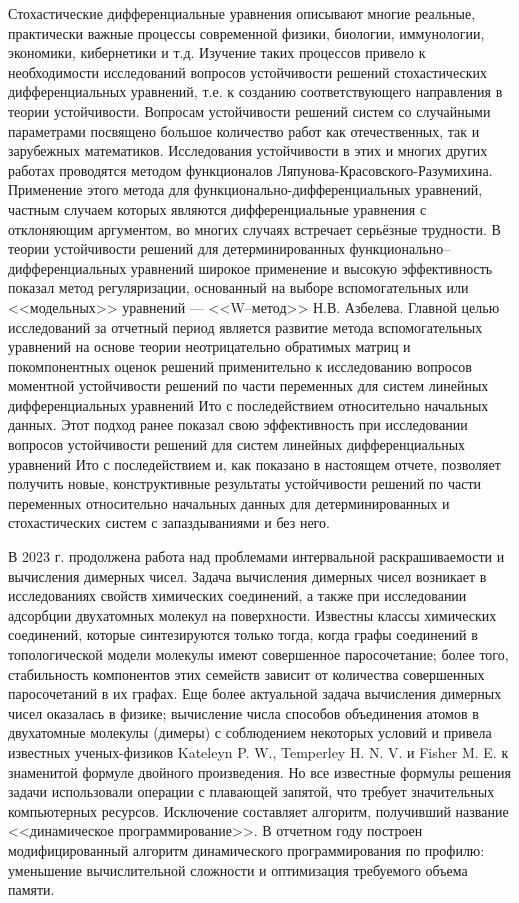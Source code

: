 Стохастические дифференциальные уравнения описывают многие реальные, практически важные процессы современной физики, биологии, иммунологии, экономики, кибернетики и т.д. Изучение таких процессов привело к необходимости исследований вопросов устойчивости решений стохастических дифференциальных
уравнений, т.е. к созданию соответствующего направления в теории устойчивости. 
Вопросам устойчивости решений систем со случайными параметрами посвящено большое количество работ как отечественных, так и
зарубежных математиков. Исследования устойчивости в этих и многих других
работах проводятся методом функционалов Ляпунова-Красовского-Разумихина. Применение этого метода для функционально-дифференциальных уравнений, частным случаем которых являются дифференциальные уравнения с отклоняющим аргументом, во многих случаях встречает серьёзные трудности. В теории устойчивости решений для детерминированных функционально--дифференциальных
уравнений широкое применение и высокую эффективность показал метод регуляризации, основанный на выборе вспомогательных или <<модельных>> уравнений  --- <<W--метод>> Н.В. Азбелева.
Главной целью исследований за отчетный период является развитие метода вспомогательных уравнений на основе теории
неотрицательно обратимых матриц и покомпонентных оценок решений применительно к исследованию вопросов моментной устойчивости решений
по части переменных для систем линейных дифференциальных уравнений Ито с последействием относительно начальных данных. Этот подход
ранее показал свою эффективность при исследовании вопросов устойчивости решений для систем линейных дифференциальных уравнений
Ито с последействием и, как показано в настоящем отчете, позволяет получить новые, конструктивные результаты устойчивости решений по
части переменных относительно начальных данных для детерминированных и стохастических систем с запаздываниями и без него.

В 2023 г. продолжена работа над проблемами интервальной раскрашиваемости и вычисления димерных чисел.
Задача вычисления димерных чисел возникает в исследованиях свойств химических соединений, а также при исследовании адсорбции двухатомных молекул на поверхности.
Известны классы химических соединений, которые синтезируются только тогда, когда графы соединений в топологической модели молекулы имеют совершенное паросочетание; более того, стабильность компонентов этих семейств зависит от количества совершенных паросочетаний в их графах.
Еще более актуальной задача вычисления димерных чисел оказалась в физике; вычисление числа способов объединения атомов в двухатомные молекулы (димеры) с соблюдением некоторых условий и привела известных ученых-физиков Kateleyn P. W., Temperley H. N. V. и Fisher M. E. к знаменитой формуле двойного произведения. Но все известные формулы решения задачи использовали операции с плавающей запятой, что требует значительных компьютерных ресурсов.
Исключение составляет алгоритм, получивший название <<динамическое программирование>>. В отчетном году построен модифицированный алгоритм динамического программирования по профилю: уменьшение вычислительной сложности и оптимизация требуемого объема памяти.


